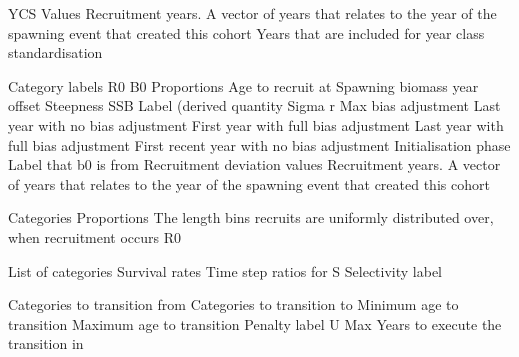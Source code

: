  {YCS Values}
 {Recruitment years. A vector of years that relates to the year of the spawning event that created this cohort}
 {Years that are included for year class standardisation}
\par\textbf{}\par
{} {Category labels}
 {R0}
 {B0}
 {Proportions}
 {Age to recruit at}
 {Spawning biomass year offset}
 {Steepness}
 {SSB Label (derived quantity}
 {Sigma r}
 {Max bias adjustment}
 {Last year with no bias adjustment}
 {First year with full bias adjustment}
 {Last year with full bias adjustment}
 {First recent year with no bias adjustment}
 {Initialisation phase Label that b0 is from}
 {Recruitment deviation values}
 {Recruitment years. A vector of years that relates to the year of the spawning event that created this cohort}
\par\textbf{}\par
{} {Categories}
 {Proportions}
 {The length bins recruits are uniformly distributed over, when recruitment occurs}
 {R0}
\par\textbf{}\par
{} {List of categories}
 {Survival rates}
 {Time step ratios for S}
 {Selectivity label}
\par\textbf{}\par
{} {Categories to transition from}
 {Categories to transition to}
 {Minimum age to transition}
 {Maximum age to transition}
 {Penalty label}
 {U Max}
 {Years to execute the transition in}
 {}
 {}
 {}
 {}
 {}
